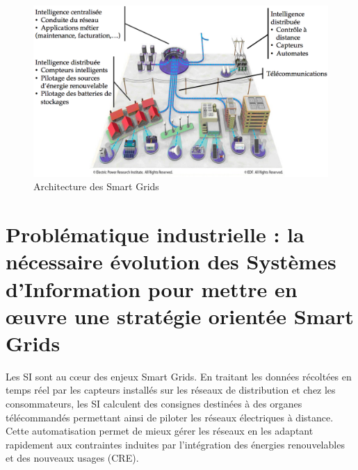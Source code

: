 \begin{figure}[!htbp]
 \begin{center}
  \includegraphics[width=1\textwidth]{images/problematique/archiSmartgrids.png}
 \end{center}
 \caption{Architecture des Smart Grids \protect\cite{favre2006ingenierie}}
 \label{fig:archismartgrids}
\end{figure}



\section{Problématique industrielle : la nécessaire évolution des Systèmes d'Information pour mettre en œuvre une stratégie orientée Smart Grids}


Les SI sont au cœur des enjeux Smart Grids. En traitant les données récoltées en temps réel par les capteurs installés sur les réseaux de distribution et chez les consommateurs, les SI calculent des consignes destinées à des organes télécommandés permettant ainsi de piloter les réseaux électriques à distance. Cette automatisation permet de mieux gérer les réseaux en les adaptant rapidement aux contraintes induites par l'intégration des énergies renouvelables et des nouveaux usages (CRE). 

